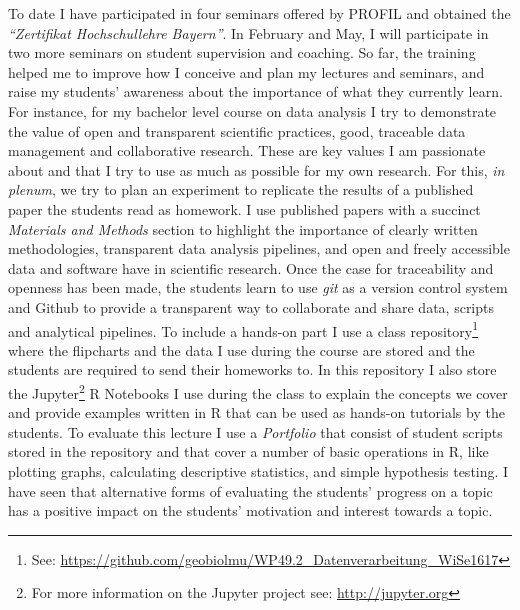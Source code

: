 \documentclass[a4paper,11pt]{article}
\begin{document}
To date I have participated in four seminars offered by PROFIL and obtained the \emph{``Zertifikat Hochschul\-lehre Bayern''}. In February and May, I will participate in two more seminars on student supervision and coaching. So far, the training helped me to improve how I conceive and plan my lectures and seminars, and raise my students' awareness about the importance of what they currently learn. For instance, for my bachelor level course on data analysis I try to demonstrate the value of open and transparent scientific practices, good, traceable data management and collaborative research. These are key values I am passionate about and that I try to use as much as possible for my own research. For this, \emph{in plenum}, we try to plan an experiment to replicate the results of a published paper the students read as homework. I use published papers with a succinct \emph{Materials and Methods} section to highlight the importance of clearly written methodologies, transparent data analysis pipelines, and open and freely accessible data and software have in scientific research. Once the case for traceability and openness has been made, the students learn to use \emph{git} as a version control system and Github to provide a transparent way to collaborate and share data, scripts and analytical pipelines. To include a hands-on part I use a class repository\footnote{See: \href{https://github.com/geobiolmu/WP49.2_Datenverarbeitung_WiSe1617}{https://github.com/geobiolmu/WP49.2\_Datenverarbeitung\_WiSe1617}} where the flipcharts and the data I use during the course are stored and the students are required to send their homeworks to. In this repository I also store the Jupyter\footnote{For more information on the Jupyter project see: \href{http://jupyter.org}{http://jupyter.org}} R Notebooks I use during the class to explain the concepts we cover and provide examples written in R that can be used as hands-on tutorials by the students. To evaluate this lecture I use a \emph{Portfolio} that consist of student scripts stored in the repository and that cover a number of basic operations in R, like plotting graphs, calculating descriptive statistics, and simple hypothesis testing. I have seen that alternative forms of evaluating the students' progress on a topic has a positive impact on the students' motivation and interest towards a topic.\\
\end{document}
